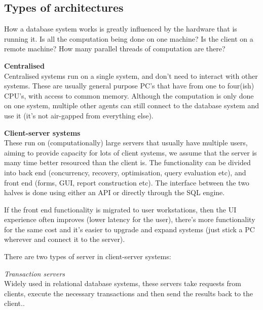 \subsection{Types of architectures}

How a database system works is greatly influenced by the hardware that is
running it. Is all the computation being done on one machine? Is the client on a
remote machine? How many parallel threads of computation are there?

\begin{description}
  \item \textbf{Centralised}\\
    Centralised systems run on a single system, and don't need to interact with
    other systems. These are usually general purpose PC's that have from one to
    four(ish) CPU's, with access to common memory. Although the computation is
    only done on one system, multiple other agents can still connect to the
    database system and use it (it's not air-gapped from everything else).

  \item \textbf{Client-server systems}\\
    These run on (computationally) large servers that usually have multiple
    users, aiming to provide capacity for lots of client systems, we assume that
    the server is many time better resourced than the client is. The
    functionality can be divided into back end (concurrency, recovery,
    optimisation, query evaluation etc), and front end (forms, GUI, report
    construction etc). The interface between the two halves is done using either
    an API or directly through the SQL engine.

    If the front end functionality is migrated to user workstations, then the UI
    experience often improves (lower latency for the user), there's more
    functionality for the same cost and it's easier to upgrade and expand
    systems (just stick a PC wherever and connect it to the server).

    There are two types of server in client-server systems:

    \begin{description}
      \item \textit{Transaction servers}\\
        Widely used in relational database systems, these servers take requests
        from clients, execute the necessary transactions and then send the
        results back to the client..


\end{description}
\end{description}

